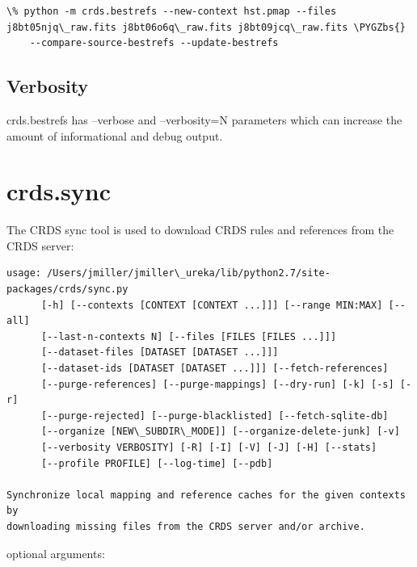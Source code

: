 \documentclass[letterpaper,10pt,english]{sphinxmanual}
\def\PYGZbs{\char`\\}
\begin{document}
\begin{Verbatim}[commandchars=\\\{\}]
\% python -m crds.bestrefs --new-context hst.pmap --files j8bt05njq\_raw.fits j8bt06o6q\_raw.fits j8bt09jcq\_raw.fits \PYGZbs{}
    --compare-source-bestrefs --update-bestrefs
\end{Verbatim}


\subsection{Verbosity}
\label{command_line_tools:verbosity}
crds.bestrefs has --verbose and --verbosity=N parameters which can increase the amount of informational
and debug output.


\section{crds.sync}
\label{command_line_tools:crds-sync}
The CRDS sync tool is used to download CRDS rules and references from the CRDS server:

\begin{Verbatim}[commandchars=\\\{\}]
usage: /Users/jmiller/jmiller\_ureka/lib/python2.7/site-packages/crds/sync.py
      [-h] [--contexts [CONTEXT [CONTEXT ...]]] [--range MIN:MAX] [--all]
      [--last-n-contexts N] [--files [FILES [FILES ...]]]
      [--dataset-files [DATASET [DATASET ...]]]
      [--dataset-ids [DATASET [DATASET ...]]] [--fetch-references]
      [--purge-references] [--purge-mappings] [--dry-run] [-k] [-s] [-r]
      [--purge-rejected] [--purge-blacklisted] [--fetch-sqlite-db]
      [--organize [NEW\_SUBDIR\_MODE]] [--organize-delete-junk] [-v]
      [--verbosity VERBOSITY] [-R] [-I] [-V] [-J] [-H] [--stats]
      [--profile PROFILE] [--log-time] [--pdb]

Synchronize local mapping and reference caches for the given contexts by
downloading missing files from the CRDS server and/or archive.
\end{Verbatim}

optional arguments:
\end{document}
